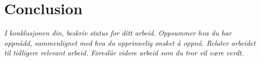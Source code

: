 
\chapter{Conclusion} %

\label{Chapter7}



\emph{I konklusjonen din, beskriv status for ditt arbeid. Oppsummer hva du har oppnådd, sammenlignet med hva du opprinnelig ønsket å oppnå. Relater arbeidet til tidligere relevant arbeid. Foreslår videre arbeid som du tror vil være verdt.}
